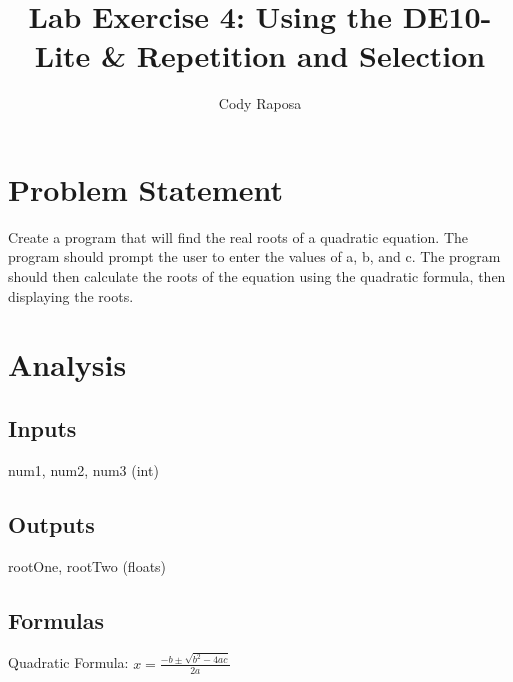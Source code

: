 \documentclass{article}
\title{Lab Exercise 4: Using the DE10-Lite \& Repetition and Selection}
\author{Cody Raposa}
\affil{ELEC2850 Microcontrollers Using C Programming}
\begin{document}
\maketitle
\begin{flushleft}
  \section{Problem Statement}
  Create a program that will find the real roots of a quadratic equation. The program should prompt the user to enter the values of a, b, and c. The program should then calculate the roots of the equation using the quadratic formula, then displaying the roots.
  \section{Analysis}
  \subsection{Inputs}
  num1, num2, num3 (int)
  \subsection{Outputs}
  rootOne, rootTwo (floats)
  \subsection{Formulas}
  Quadratic Formula: $x = \frac{-b \pm \sqrt{b^2 - 4ac}}{2a}$

\end{flushleft}
\end{document}
